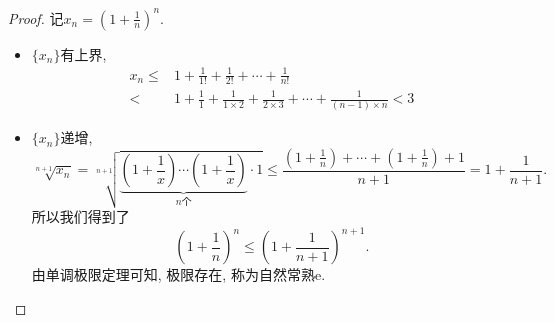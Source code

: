 \begin{proof}
    记$x_n = \left( 1+\frac{1}{n} \right) ^{n}$.
    \begin{itemize}
      \item $\{ x_n \}$有上界, 
      \begin{equation}
        \begin{aligned}
          x_n \le  & 1 + \frac{1}{1!} + \frac{1}{2!} + \cdots + \frac{1}{n!}
          \\
          < & 1 + \frac{1}{1} + \frac{1}{1\times 2} + \frac{1}{2\times 3} + \cdots + \frac{1}{\left( n-1 \right) \times n} <3
        \end{aligned}
      \end{equation}

      \item $\{ x_n \}$递增,
      \begin{equation}
        \sqrt[n+1]{x_n} = \sqrt[n+1]{\underbrace{\left( 1+\frac{1}{x} \right) \cdots \left( 1+\frac{1}{x} \right) }_{\text{$n$个}}\cdot 1} \le  \frac{\left( 1+\frac{1}{n} \right) + \cdots + \left( 1+\frac{1}{n} \right) +1}{n+1} = 1 + \frac{1}{n+1}.
      \end{equation}
      所以我们得到了
      \begin{equation}
        \left( 1+\frac{1}{n} \right) ^{n} \le \left( 1+\frac{1}{n+1} \right) ^{n+1}.
      \end{equation}
      由单调极限定理可知, 极限存在, 称为自然常熟$\mathrm{e}$.
    \end{itemize}
\end{proof}

